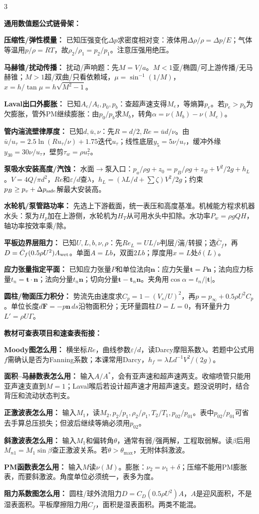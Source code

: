 \documentclass[a4paper]{article}
\newcommand{\sect}[1]{\par{\bfseries\color{Q}#1：}}
\begin{document}
\begin{multicols}{3}
{\sect{通用数值题公式链骨架}
\sect{压缩性/弹性模量}
已知压强变化$\Delta p$求密度相对变：液体用$\Delta\rho/\rho=\Delta p/E$；气体等温用$p/\rho=RT$，故$\rho_2/\rho_1=p_2/p_1$。注意压强用绝压。
\sect{马赫锥/扰动传播}
扰动/声响题：先$M=V/a$。$M<1$亚/椭圆/可上游传播/无马赫锥；$M>1$超/双曲/只看依赖域，$\mu=\sin^{-1}(1/M)$，$x=h/\tan\mu=h\sqrt{M^2-1}$。
\sect{Laval出口外膨胀}
已知$A_e/A_t,p_0,p_b$：查超声速支得$M_e$，等熵算$p_e$。若$p_e>p_b$为欠膨胀，管外PM继续膨胀：由$p_0/p_b$求$M_b$，转角$\alpha=\nu(M_b)-\nu(M_e)$。
\sect{管内湍流壁律厚度}
已知$d,\bar u,\nu$：先$R=d/2,Re=\bar ud/\nu$。由$\bar u/u_\tau=2.5\ln(Ru_\tau/\nu)+1.75$迭代$u_\tau$；线性底层$y_5=5\nu/u_\tau$，缓冲外缘$y_{30}=30\nu/u_\tau$，壁剪$\tau_w=\rho u_\tau^2$。
\sect{泵吸水安装高度/汽蚀}
水面$\to$泵入口：$p_a/\rho g+z_0=p_B/\rho g+z_B+V^2/2g+h_L$。$V=4Q/\pi d^2$，$Re$和$\varepsilon/d$查$\lambda$，$h_L=(\lambda L/d+\sum\zeta)V^2/2g$；约束$p_B\ge p_v+\Delta p_{\rm safe}$解最大安装高。
\sect{水轮机/泵管路功率}
先选上下游截面，统一表压和高度基准。机械能方程求机器水头：泵为$H_p$加在上游侧，水轮机为$H_T$从可用水头中扣除。水功率$P_w=\rho gQH$，轴功率按效率乘/除。
\sect{平板边界层阻力}
已知$U,L,b,\nu,\rho$：先$Re_L=UL/\nu$判层/湍/转捩；选$\bar C_f$，再$D=\bar C_f(0.5\rho U^2)A_{\rm wet}$。单面$A=Lb$，双面$2Lb$；厚度用$x=L$处$\delta(L)$。
\sect{应力张量指定平面}
已知应力张量$P$和单位法向$\bm n$：应力矢量$\bm t=P\bm n$；法向应力标量$t_n=\bm t\cdot\bm n$；法向分量$t_n\bm n$；切向分量$\bm t-\bm t_n\bm n$。夹角用$\cos\alpha=t_n/|\bm t|$。
\sect{圆柱/物面压力积分}
势流先由速度求$C_p=1-(V_s/U)^2$，再$p=p_\infty+0.5\rho U^2 C_p$。单位长度$d\bm F=-p\bm n\,ds$沿物面积分；无环量圆柱$D=L=0$，有环量升力$L'=\rho U\Gamma$。

\sect{教材可查表项目和速查表衔接}
\sect{Moody图怎么用}
横坐标$Re$，曲线参数$\varepsilon/d$，读Darcy摩阻系数$\lambda$。若题中公式用$f$需确认是否为Fanning系数；本课常用Darcy，$h_f=\lambda Ld^{-1}V^2/(2g)$。
\sect{面积--马赫数表怎么用}
输入$A/A^*$，会有亚声速和超声速两支。收缩喷管只能用亚声速支直到$M=1$；Laval喉后若设计超声速才用超声速支。题没说明时，结合背压和流动状态判支。
\sect{正激波表怎么用}
输入$M_1$，读$M_2,p_2/p_1,\rho_2/\rho_1,T_2/T_1,p_{02}/p_{01}$。表中$p_{02}/p_{01}$可省去手算总压损失；但波后继续等熵必须用$p_{02}$。
\sect{斜激波表怎么用}
输入$M_1$和偏转角$\theta$，通常有弱/强两解，工程取弱解。读$\beta$后用$M_{n1}=M_1\sin\beta$查正激波关系。若$\theta>\theta_{\max}$，无附体斜激波。
\sect{PM函数表怎么用}
输入$M$读$\nu(M)$。膨胀：$\nu_2=\nu_1+\delta$；压缩不能用PM膨胀表，而要斜激波。角度单位必须统一，表多为度。
\sect{阻力系数图怎么用}
圆柱/球外流阻力$D=C_D(0.5\rho U^2)A$，$A$是迎风面积，不是湿表面积。平板摩擦阻力用$C_f$，面积是湿表面积。两类不能混。

}
\end{multicols}
\end{document}

